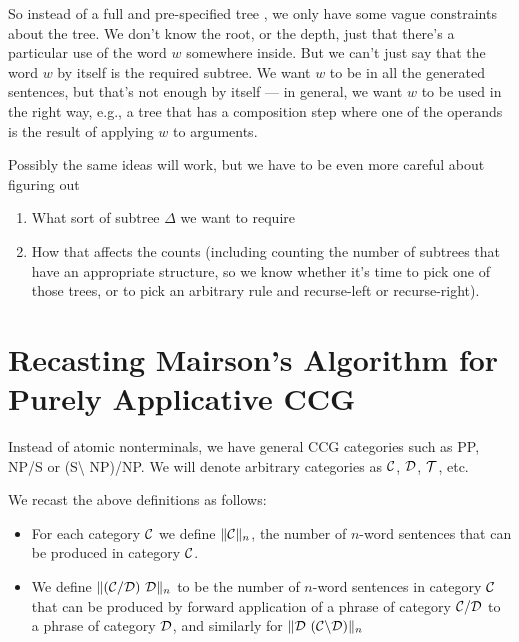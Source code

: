 \documentclass[10pt]{article}
\begin{document}
So instead of a full and pre-specified tree \Delta, we only have some vague constraints about the tree.  We don't know the root, or the depth, just that there's a particular use of the word $w$ somewhere inside. But we can't just say that the word $w$ by itself is the required subtree. We want $w$ to be in all the generated sentences, but that's not enough by itself --- in general, we want $w$ to be used in the right way, e.g., a tree that has a composition step where one of the operands is the result of applying $w$ to arguments.

Possibly the same ideas will work, but we have to be even more careful about figuring out
\begin{enumerate}
    \item What sort of subtree $\Delta$ we want to require
    \item How that affects the counts (including counting the number of subtrees
    that have an appropriate structure, so we know whether it's time to pick
    one of those trees, or to pick an arbitrary rule and recurse-left or recurse-right).
\end{enumerate}

\section{Recasting Mairson's Algorithm for Purely Applicative CCG}

\newcommand{\A}{\ensuremath{{\cal A}}}
\newcommand{\B}{\ensuremath{{\cal B}}}
\newcommand{\C}{\ensuremath{{\cal C}}}
\newcommand{\D}{\ensuremath{{\cal D}}}
\newcommand{\T}{\ensuremath{{\cal T}}}
\newcommand{\X}{\ensuremath{{\cal X}}}
\newcommand{\CAT}{\ensuremath{\mbox{CAT}}}
\newcommand{\LEX}{\ensuremath{\mbox{LEX}}}

Instead of atomic nonterminals, we have general CCG categories such as PP, NP/S or (S\textbackslash{} NP)/NP{}. We will denote arbitrary categories as $\C$, $\D$, $\T$, etc.


We recast the above definitions as follows:
\begin{itemize}
    \item
For each category $\C$ we define $\|\C\|_n$, the number of $n$-word sentences that can be produced in category $\C$.
\item We define $\| (\C/\D)\ \D\|_n$ to be the number of $n$-word sentences in category \(\C\) that can be produced by forward application of a phrase of category \(\C/\D\) to a phrase of category $\D$, and similarly for \(\| \D\ (\C\backslash \D)\|_n\)

\end{itemize}
\end{document}
